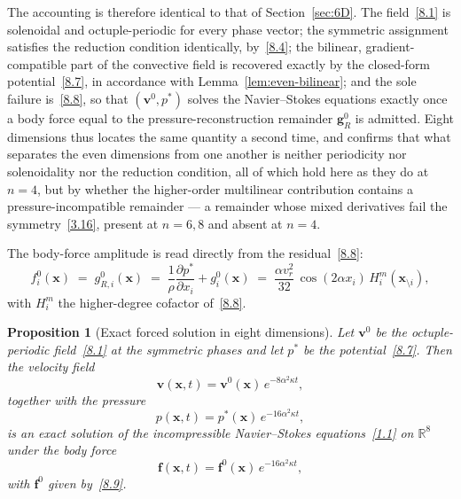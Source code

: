 \documentclass[11pt]{jfm}
\newtheorem{proposition}[lemma]{Proposition}
\numberwithin{equation}{section}
\begin{document}
The accounting is therefore identical to that of Section~\ref{sec:6D}. The
field~\eqref{8.1} is solenoidal and octuple-periodic for every phase vector; the symmetric
assignment satisfies the reduction condition identically, by~\eqref{8.4}; the bilinear,
gradient-compatible part of the convective field is recovered exactly by the closed-form
potential~\eqref{8.7}, in accordance with Lemma~\ref{lem:even-bilinear}; and the
sole failure is~\eqref{8.8}, so that $(\boldsymbol{v}^0,p^{*})$ solves the Navier--Stokes
equations exactly once a body force equal to the pressure-reconstruction remainder $\boldsymbol{g}^{0}_{R}$ is
admitted. Eight dimensions thus locates the same quantity a second time, and confirms that what separates the even dimensions from one another is neither periodicity nor
solenoidality nor the reduction condition, all of which hold here as they do at $n=4$, but by
whether the higher-order multilinear contribution contains a pressure-incompatible remainder ---
a remainder whose mixed derivatives fail the symmetry~\eqref{3.16}, present at $n=6,8$ and absent
at $n=4$.

\noindent The body-force amplitude is read directly from the residual~\eqref{8.8}:
\begin{equation}
\label{8.9}
f_i^0(\boldsymbol{x}) \;=\; g_{R,i}^{0}(\boldsymbol{x})
\;=\; \frac{1}{\rho}\frac{\partial p^{*}}{\partial x_i}+g_i^0(\boldsymbol{x})
\;=\; \frac{\alpha v_r^2}{32}\,\cos(2\alpha x_i)\,H_i^{m}(\boldsymbol{x}_{\setminus i}),
\end{equation}
with $H_i^{m}$ the higher-degree cofactor of~\eqref{8.8}.

\begin{proposition}[Exact forced solution in eight dimensions]
\label{prop:8D-forced}
Let $\boldsymbol{v}^0$ be the octuple-periodic field~\eqref{8.1} at the symmetric phases and let
$p^{*}$ be the potential~\eqref{8.7}. Then the velocity field
\begin{equation}
\label{8.9a}
\boldsymbol{v}(\boldsymbol{x},t)=\boldsymbol{v}^0(\boldsymbol{x})\,e^{-8\alpha^2\kappa t},
\end{equation}
together with the pressure
\begin{equation}
\label{8.9b}
p(\boldsymbol{x},t)=p^{*}(\boldsymbol{x})\,e^{-16\alpha^2\kappa t},
\end{equation}
is an exact solution of the incompressible Navier--Stokes equations~\eqref{1.1} on $\mathbb{R}^8$
under the body force
\begin{equation}
\label{8.9c}
\boldsymbol{f}(\boldsymbol{x},t)=\boldsymbol{f}^0(\boldsymbol{x})\,e^{-16\alpha^2\kappa t},
\end{equation}
with $\boldsymbol{f}^0$ given by~\eqref{8.9}.
\end{proposition}
\end{document}

